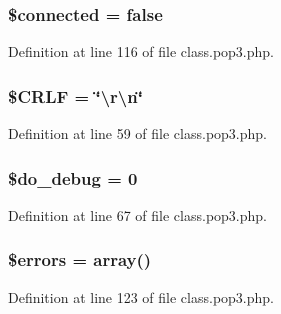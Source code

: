 \subsubsection[{\texorpdfstring{\$connected}{$connected}}]{\setlength{\rightskip}{0pt plus 5cm}\$connected = false\hspace{0.3cm}{\ttfamily [protected]}}\hypertarget{class_p_o_p3_adb9756d4524181e191069eaa76afb6cf}{}\label{class_p_o_p3_adb9756d4524181e191069eaa76afb6cf}


Definition at line 116 of file class.\+pop3.\+php.

\subsubsection[{\texorpdfstring{\$\+C\+R\+LF}{$CRLF}}]{\setlength{\rightskip}{0pt plus 5cm}\${\bf C\+R\+LF} = \char`\"{}\textbackslash{}r\textbackslash{}n\char`\"{}}\hypertarget{class_p_o_p3_a75538b15bafd1ec1eaaa6ea0bbfa642a}{}\label{class_p_o_p3_a75538b15bafd1ec1eaaa6ea0bbfa642a}


Definition at line 59 of file class.\+pop3.\+php.

\subsubsection[{\texorpdfstring{\$do\+\_\+debug}{$do_debug}}]{\setlength{\rightskip}{0pt plus 5cm}\$do\+\_\+debug = 0}\hypertarget{class_p_o_p3_a09ca59ee83fba6c8137646a13f1664d1}{}\label{class_p_o_p3_a09ca59ee83fba6c8137646a13f1664d1}


Definition at line 67 of file class.\+pop3.\+php.

\subsubsection[{\texorpdfstring{\$errors}{$errors}}]{\setlength{\rightskip}{0pt plus 5cm}\$errors = array()\hspace{0.3cm}{\ttfamily [protected]}}\hypertarget{class_p_o_p3_ab24faf4aa647cdcee494fc48524ad4ff}{}\label{class_p_o_p3_ab24faf4aa647cdcee494fc48524ad4ff}


Definition at line 123 of file class.\+pop3.\+php.

